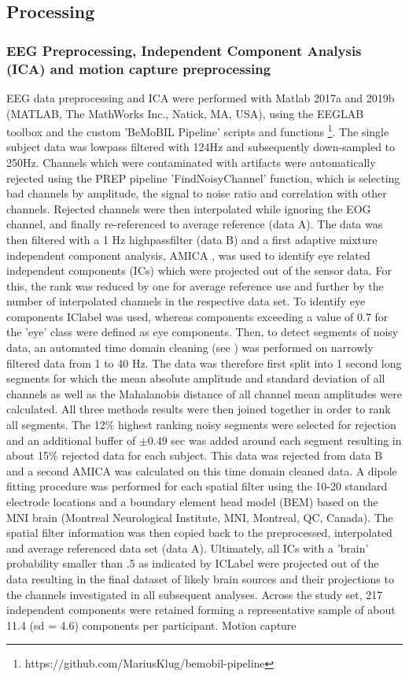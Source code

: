 \subsection{Processing}
\subsubsection{EEG Preprocessing, Independent Component Analysis (ICA) and motion capture preprocessing}
EEG data preprocessing and ICA were performed with Matlab 2017a and 2019b (MATLAB, The MathWorks Inc., Natick, MA, USA), using the EEGLAB toolbox \cite{Delorme2004a} and the custom 'BeMoBIL Pipeline' scripts and functions \footnote{https://github.com/MariusKlug/bemobil-pipeline}. The single subject data was lowpass filtered with 124Hz and subsequently down-sampled to 250Hz. Channels which were contaminated with artifacts were automatically rejected using the PREP pipeline \cite{Bigdely-Shamlo2015} 'FindNoisyChannel' function, which is selecting bad channels by amplitude, the signal to noise ratio and correlation with other channels. Rejected channels were then interpolated while ignoring the EOG channel, and finally re-referenced to average reference (data A). The data was then filtered with a 1 Hz highpassfilter (data B) and a first adaptive mixture independent component analysis, AMICA \cite{Palmer2011}, was used to identify eye related independent components (ICs) which were projected out of the sensor data. For this, the rank was reduced by one for average reference use and further by the number of interpolated channels in the respective data set. To identify eye components IClabel \cite{Pion-Tonachini2019} was used, whereas components exceeding a value of 0.7 for the 'eye' class were defined as eye components. Then, to detect segments of noisy data, an automated time domain cleaning (see \citet{Gramann2018}) was performed on narrowly filtered data from 1 to 40 Hz. The data was therefore first split into 1 second long segments for which the mean absolute amplitude and standard deviation of all channels as well as the Mahalanobis distance of all channel mean amplitudes were calculated. All three methods results were then joined together in order to rank all segments. The 12\% highest ranking noisy segments were selected for rejection and an additional buffer of $\pm 0.49$ sec was added around each segment resulting in about 15\% rejected data for each subject. This data was rejected from data B and a second AMICA was calculated on this time domain cleaned data. A dipole fitting procedure was performed for each spatial filter using the 10-20 standard electrode locations and a boundary element head model (BEM) based on the MNI brain (Montreal Neurological Institute, MNI, Montreal, QC, Canada). The spatial filter information was then copied back to the preprocessed, interpolated and average referenced data set (data A). Ultimately, all ICs with a 'brain' probability smaller than .5 as indicated by ICLabel were projected out of the data resulting in the final dataset of likely brain sources and their projections to the channels investigated in all subsequent analyses. Across the study set, 217 independent components were retained forming a representative sample of about 11.4 (sd = 4.6) components per participant. Motion capture 